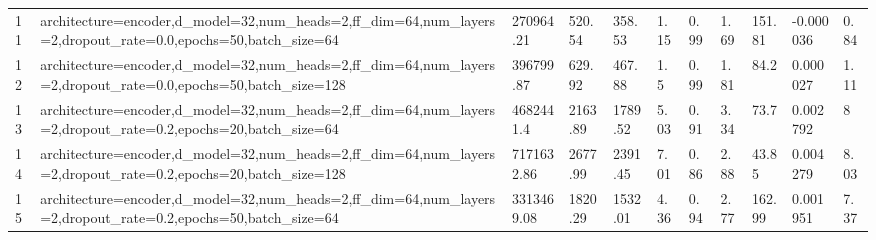 \begin{longtable}{C{0.8cm} L{2cm} C{1.15cm} C{1.15cm} C{1.15cm} C{1.15cm} C{0.85cm} C{1.25cm} C{1.2cm} C{1.5cm} C{1.0cm}}
11 & architecture=encoder,\newline d\_model=32,\newline num\_heads=2,\newline ff\_dim=64,\newline num\_layers=2,\newline dropout\_rate=0.0,\newline epochs=50,\newline batch\_size=64 & 270964.21 & 520.54 & 358.53 & 1.15 & 0.99 & 1.69 & 151.81 & -0.000036 & 0.84 \\
12 & architecture=encoder,\newline d\_model=32,\newline num\_heads=2,\newline ff\_dim=64,\newline num\_layers=2,\newline dropout\_rate=0.0,\newline epochs=50,\newline batch\_size=128 & 396799.87 & 629.92 & 467.88 & 1.5 & 0.99 & 1.81 & 84.2 & 0.000027 & 1.11 \\
13 & architecture=encoder,\newline d\_model=32,\newline num\_heads=2,\newline ff\_dim=64,\newline num\_layers=2,\newline dropout\_rate=0.2,\newline epochs=20,\newline batch\_size=64 & 4682441.4 & 2163.89 & 1789.52 & 5.03 & 0.91 & 3.34 & 73.7 & 0.002792 & 8 \\
14 & architecture=encoder,\newline d\_model=32,\newline num\_heads=2,\newline ff\_dim=64,\newline num\_layers=2,\newline dropout\_rate=0.2,\newline epochs=20,\newline batch\_size=128 & 7171632.86 & 2677.99 & 2391.45 & 7.01 & 0.86 & 2.88 & 43.85 & 0.004279 & 8.03 \\
15 & architecture=encoder,\newline d\_model=32,\newline num\_heads=2,\newline ff\_dim=64,\newline num\_layers=2,\newline dropout\_rate=0.2,\newline epochs=50,\newline batch\_size=64 & 3313469.08 & 1820.29 & 1532.01 & 4.36 & 0.94 & 2.77 & 162.99 & 0.001951 & 7.37 \\

\end{longtable}
